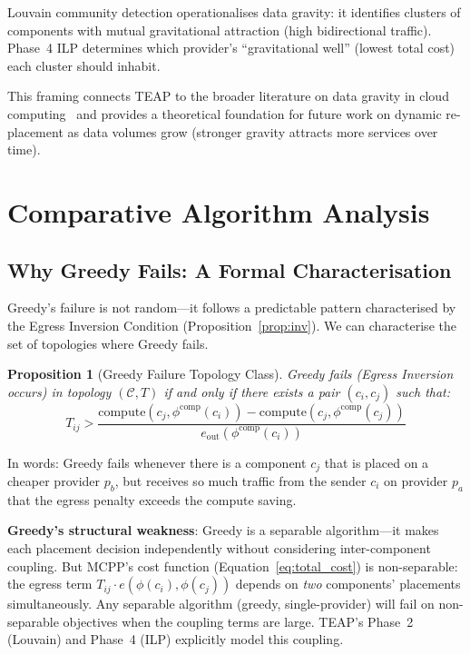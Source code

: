 \documentclass[10pt,journal]{IEEEtran}
\newtheorem{proposition}[theorem]{Proposition}
\begin{document}
Louvain community detection operationalises data gravity: it identifies clusters
of components with mutual gravitational attraction (high bidirectional traffic).
Phase~4 ILP determines which provider's ``gravitational well'' (lowest total cost)
each cluster should inhabit.

This framing connects TEAP to the broader literature on data gravity in cloud
computing~\cite{tremblay2011} and provides a theoretical foundation for future
work on dynamic re-placement as data volumes grow (stronger gravity attracts
more services over time).

\section{Comparative Algorithm Analysis}\label{sec:algo_compare}

\subsection{Why Greedy Fails: A Formal Characterisation}

Greedy's failure is not random---it follows a predictable pattern characterised
by the Egress Inversion Condition (Proposition~\ref{prop:inv}).
We can characterise the set of topologies where Greedy fails.

\begin{proposition}[Greedy Failure Topology Class]\label{prop:greedy_fail}
Greedy fails (Egress Inversion occurs) in topology $(\mathcal{C}, T)$ if and only
if there exists a pair $(c_i, c_j)$ such that:
\begin{equation}
T_{ij} > \frac{\text{compute}(c_j, \phi^{\text{comp}}(c_i)) - \text{compute}(c_j, \phi^{\text{comp}}(c_j))}{e_{\text{out}}(\phi^{\text{comp}}(c_i))}
\end{equation}
\end{proposition}
In words: Greedy fails whenever there is a component $c_j$ that is placed on a
cheaper provider $p_b$, but receives so much traffic from the sender $c_i$ on
provider $p_a$ that the egress penalty exceeds the compute saving.

\textbf{Greedy's structural weakness}: Greedy is a separable algorithm---it makes
each placement decision independently without considering inter-component coupling.
But MCPP's cost function (Equation~\ref{eq:total_cost}) is non-separable:
the egress term $T_{ij} \cdot e(\phi(c_i), \phi(c_j))$ depends on \emph{two}
components' placements simultaneously.
Any separable algorithm (greedy, single-provider) will fail on non-separable
objectives when the coupling terms are large.
TEAP's Phase~2 (Louvain) and Phase~4 (ILP) explicitly model this coupling.
\end{document}
